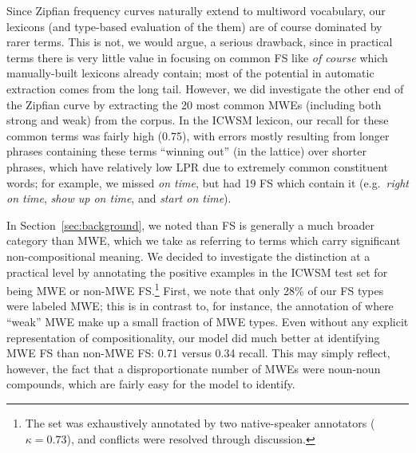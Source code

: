\documentclass[11pt,letterpaper]{article}
\newcommand{\ex}[1]{\textit{#1}\xspace}
\newcommand{\secref}[2][]{Section#1~\ref{#2}\xspace}
\begin{document}
Since Zipfian frequency curves naturally extend to multiword vocabulary, our lexicons (and type-based evaluation of the them) are of course dominated by rarer terms. This is not, we would argue, a serious drawback, since in practical terms there is very little value in focusing on common FS like \ex{of course} which manually-built lexicons already contain; most of the potential in automatic extraction comes from the long tail. However, we did investigate the other end of the Zipfian curve by extracting the 20 most common MWEs (including both strong and weak) from the  corpus. In the ICWSM lexicon, our recall for these common terms was fairly high (0.75), with errors mostly resulting from longer phrases containing these terms ``winning out'' (in the lattice) over shorter phrases, which have relatively low LPR due to extremely common constituent words; for example, we missed \ex{on time}, but had 19 FS which contain it (e.g.\ \ex{right on time}, \ex{show up on time}, and \ex{start on time}). 



In \secref{sec:background}, we noted than FS is generally a much broader category than MWE, which we take as referring to terms which carry significant non-compositional meaning. We decided to investigate the distinction at a practical level by annotating the positive examples in the ICWSM test set for being MWE or non-MWE FS.\footnote{The set was exhaustively annotated by two native-speaker annotators ($\kappa = 0.73$), and conflicts were resolved through discussion.} First, we note that only 28\% of our FS types were labeled MWE; this is in contrast to, for instance, the annotation of  where ``weak'' MWE make up a small fraction of MWE types. Even without any explicit representation of compositionality, our model did much better at identifying MWE FS than non-MWE FS:  0.71 versus 0.34 recall. This may simply reflect, however, the fact that a disproportionate number of MWEs were noun-noun compounds, which are fairly easy for the model to identify.
\end{document}
